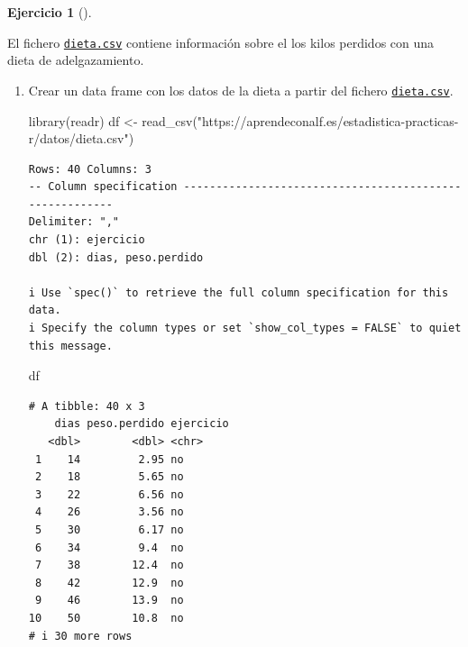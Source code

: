 \documentclass[
  spanish,
  a4paper,
]{scrreport}
\newenvironment{Shaded}{\begin{snugshade}}{\end{snugshade}}
\newcommand{\FunctionTok}[1]{\textcolor[rgb]{0.28,0.35,0.67}{#1}}
\newcommand{\NormalTok}[1]{\textcolor[rgb]{0.00,0.23,0.31}{#1}}
\newcommand{\OtherTok}[1]{\textcolor[rgb]{0.00,0.23,0.31}{#1}}
\newcommand{\StringTok}[1]{\textcolor[rgb]{0.13,0.47,0.30}{#1}}
\theoremstyle{definition}
\newtheorem{exercise}{Ejercicio}[chapter]
\theoremstyle{remark}
\begin{document}
\begin{exercise}[]\protect\hypertarget{exr-regresion-dieta}{}\label{exr-regresion-dieta}

El fichero \href{datos/dieta.csv}{\texttt{dieta.csv}} contiene
información sobre el los kilos perdidos con una dieta de adelgazamiento.

\begin{enumerate}
\def\labelenumi{\alph{enumi}.}
\item
  Crear un data frame con los datos de la dieta a partir del fichero
  \href{https://aprendeconalf.es/estadistica-practicas-r/datos/dieta.csv}{\texttt{dieta.csv}}.

  \begin{tcolorbox}[enhanced jigsaw, arc=.35mm, bottomrule=.15mm, bottomtitle=1mm, breakable, colback=white, colbacktitle=quarto-callout-tip-color!10!white, colframe=quarto-callout-tip-color-frame, coltitle=black, left=2mm, leftrule=.75mm, opacityback=0, opacitybacktitle=0.6, rightrule=.15mm, title=\textcolor{quarto-callout-tip-color}{\faLightbulb}\hspace{0.5em}{Solución}, titlerule=0mm, toprule=.15mm, toptitle=1mm]

\begin{Shaded}
\begin{Highlighting}[]
\FunctionTok{library}\NormalTok{(readr)}
\NormalTok{df }\OtherTok{\textless{}{-}} \FunctionTok{read\_csv}\NormalTok{(}\StringTok{"https://aprendeconalf.es/estadistica{-}practicas{-}r/datos/dieta.csv"}\NormalTok{)}
\end{Highlighting}
\end{Shaded}

\begin{verbatim}
Rows: 40 Columns: 3
-- Column specification --------------------------------------------------------
Delimiter: ","
chr (1): ejercicio
dbl (2): dias, peso.perdido

i Use `spec()` to retrieve the full column specification for this data.
i Specify the column types or set `show_col_types = FALSE` to quiet this message.
\end{verbatim}

\begin{Shaded}
\begin{Highlighting}[]
\NormalTok{df}
\end{Highlighting}
\end{Shaded}

\begin{verbatim}
# A tibble: 40 x 3
    dias peso.perdido ejercicio
   <dbl>        <dbl> <chr>    
 1    14         2.95 no       
 2    18         5.65 no       
 3    22         6.56 no       
 4    26         3.56 no       
 5    30         6.17 no       
 6    34         9.4  no       
 7    38        12.4  no       
 8    42        12.9  no       
 9    46        13.9  no       
10    50        10.8  no       
# i 30 more rows
\end{verbatim}


\end{tcolorbox}
\end{enumerate}
\end{exercise}
\end{document}
